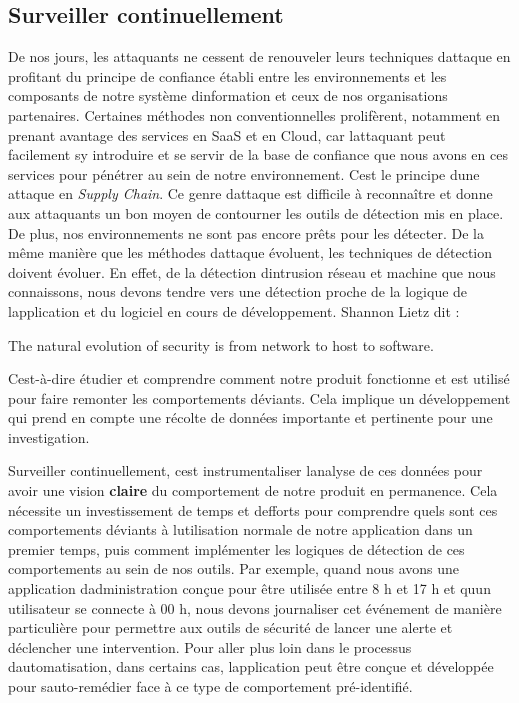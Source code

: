 \documentclass[
  11pt,
  a4paper,
  krantz2,
  11pt,
  oneside]{krantz}
\renewenvironment{quote}{\begin{VF}}{\end{VF}}
\begin{document}
\subsection{Surveiller continuellement}\label{surveiller-continuellement}

De nos jours, les attaquants ne cessent de renouveler leurs techniques d\textquotesingle attaque en profitant du principe de confiance établi entre les environnements et les composants de notre système d\textquotesingle information et ceux de nos organisations partenaires. Certaines méthodes non conventionnelles prolifèrent, notamment en prenant avantage des services en SaaS et en Cloud, car l\textquotesingle attaquant peut facilement s\textquotesingle y introduire et se servir de la base de confiance que nous avons en ces services pour pénétrer au sein de notre environnement. C\textquotesingle est le principe d\textquotesingle une attaque en \emph{Supply Chain}. Ce genre d\textquotesingle attaque est difficile à reconnaître et donne aux attaquants un bon moyen de contourner les outils de détection mis en place. De plus, nos environnements ne sont pas encore prêts pour les détecter. De la même manière que les méthodes d\textquotesingle attaque évoluent, les techniques de détection doivent évoluer. En effet, de la détection d\textquotesingle intrusion réseau et machine que nous connaissons, nous devons tendre vers une détection proche de la logique de l\textquotesingle application et du logiciel en cours de développement. Shannon Lietz dit :

\begin{quote}
The natural evolution of security is from network to host to software.
\end{quote}

C\textquotesingle est-à-dire étudier et comprendre comment notre produit fonctionne et est utilisé pour faire remonter les comportements déviants. Cela implique un développement qui prend en compte une récolte de données importante et pertinente pour une investigation.

Surveiller continuellement, c\textquotesingle est instrumentaliser l\textquotesingle analyse de ces données pour avoir une vision \textbf{claire} du comportement de notre produit en permanence. Cela nécessite un investissement de temps et d\textquotesingle efforts pour comprendre quels sont ces comportements déviants à l\textquotesingle utilisation normale de notre application dans un premier temps, puis comment implémenter les logiques de détection de ces comportements au sein de nos outils. Par exemple, quand nous avons une application d\textquotesingle administration conçue pour être utilisée entre 8 h et 17 h et qu\textquotesingle un utilisateur se connecte à 00 h, nous devons journaliser cet événement de manière particulière pour permettre aux outils de sécurité de lancer une alerte et déclencher une intervention. Pour aller plus loin dans le processus d\textquotesingle automatisation, dans certains cas, l\textquotesingle application peut être conçue et développée pour s\textquotesingle auto-remédier face à ce type de comportement pré-identifié.
\end{document}
